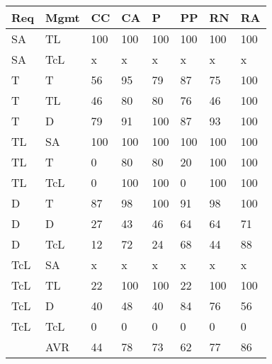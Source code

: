 \begin{tabularx}{\columnwidth}{|l|X|X|X|X|X|X|X|}
\hline
Req	& Mgmt & CC   & CA   & P    & PP   & RN	  & RA   \\\hline
SA     & TL    & 100  & 100  & 100  & 100  & 100  & 100   \\\hline
SA     & TcL   & x    & x    & x    & x    & x    & x     \\\hline
T      & T     & 56   & 95   & 79   & 87   & 75   & 100   \\\hline
T      & TL    & 46   & 80   & 80   & 76   & 46   & 100   \\\hline
T      & D     & 79   & 91   & 100  & 87   & 93   & 100   \\\hline
TL     & SA    & 100  & 100  & 100  & 100  & 100  & 100   \\\hline
TL     & T     & 0    & 80   & 80   & 20   & 100  & 100   \\\hline
TL     & TcL   & 0    & 100  & 100  & 0    & 100  & 100   \\\hline
D      & T     & 87   & 98   & 100  & 91   & 98   & 100   \\\hline
D      & D     & 27   & 43   & 46   & 64   & 64   & 71    \\\hline
D      & TcL   & 12   & 72   & 24   & 68   & 44   & 88    \\\hline
TcL    & SA    & x    & x    & x    & x    & x    & x     \\\hline
TcL    & TL    & 22   & 100  & 100  & 22   & 100  & 100   \\\hline
TcL    & D     & 40   & 48   & 40   & 84   & 76   & 56    \\\hline
TcL    & TcL   & 0    & 0    & 0    & 0    & 0    & 0     \\\hline
       & AVR   & 44   & 78   & 73   & 62   & 77   & 86    \\\hline
\end{tabularx}